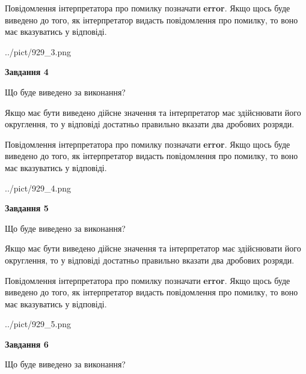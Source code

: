 \documentclass[12pt, ukrainian]{article}
\begin{document}
{\begin {Large}
Повідомлення інтерпретатора про помилку позначати \textbf{error}.
Якщо щось буде виведено до того, як інтерпретатор видасть повідомлення про помилку, 
то воно має вказуватись у відповіді. \par

\begin{center}
	{../pict/929_3.png}
\end{center}
\newpage

{\begin {center}\textbf{Завдання 4}\end {center}}\par
Що буде виведено за виконання? \par

Якщо має бути виведено дійсне значення та інтерпретатор має здійснювати його округлення, 
то у відповіді достатньо правильно вказати два дробових розряди.

Повідомлення інтерпретатора про помилку позначати \textbf{error}.
Якщо щось буде виведено до того, як інтерпретатор видасть повідомлення про помилку, 
то воно має вказуватись у відповіді. \par

\begin{center}
	{../pict/929_4.png}
\end{center}
\newpage

{\begin {center}\textbf{Завдання 5}\end {center}}\par
Що буде виведено за виконання? \par

Якщо має бути виведено дійсне значення та інтерпретатор має здійснювати його округлення, 
то у відповіді достатньо правильно вказати два дробових розряди.

Повідомлення інтерпретатора про помилку позначати \textbf{error}.
Якщо щось буде виведено до того, як інтерпретатор видасть повідомлення про помилку, 
то воно має вказуватись у відповіді. \par

\begin{center}
	{../pict/929_5.png}
\end{center}
\newpage

{\begin {center}\textbf{Завдання 6}\end {center}}\par
Що буде виведено за виконання? \par


\end{Large}}
\end{document}
